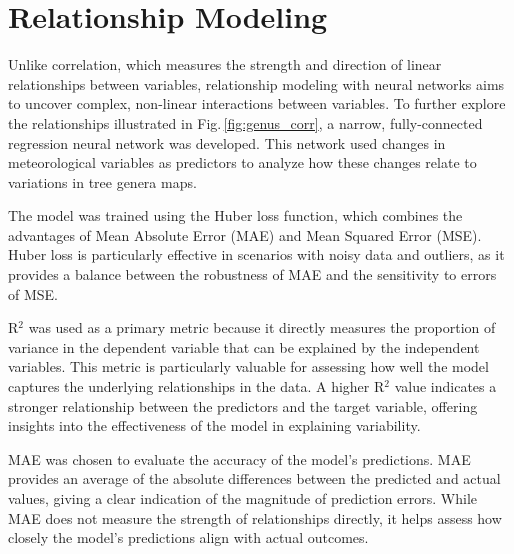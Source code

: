\section{Relationship Modeling}

Unlike correlation, which measures the strength and direction of linear relationships between variables, relationship modeling with neural networks aims to uncover complex, non-linear interactions between variables. To further explore the relationships illustrated in Fig.\,\ref{fig:genus_corr}, a narrow, fully-connected regression neural network was developed. This network used changes in meteorological variables as predictors to analyze how these changes relate to variations in tree genera maps.

The model was trained using the Huber loss function, which combines the advantages of Mean Absolute Error (MAE) and Mean Squared Error (MSE). Huber loss is particularly effective in scenarios with noisy data and outliers, as it provides a balance between the robustness of MAE and the sensitivity to errors of MSE. 

R$^2$ was used as a primary metric because it directly measures the proportion of variance in the dependent variable that can be explained by the independent variables. This metric is particularly valuable for assessing how well the model captures the underlying relationships in the data. A higher R$^2$ value indicates a stronger relationship between the predictors and the target variable, offering insights into the effectiveness of the model in explaining variability.

MAE was chosen to evaluate the accuracy of the model's predictions. MAE provides an average of the absolute differences between the predicted and actual values, giving a clear indication of the magnitude of prediction errors. While MAE does not measure the strength of relationships directly, it helps assess how closely the model's predictions align with actual outcomes.


